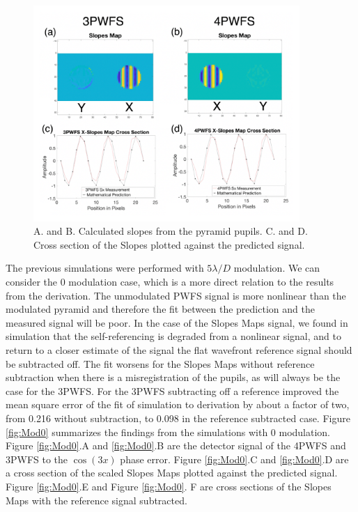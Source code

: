 \begin{figure}
    \centering
    \includegraphics[width=0.9\textwidth]{Chapter Materials/Chapter Two Materials/SlopesandSlices.png}
    \caption{A. and B. Calculated slopes from the pyramid pupils. C. and D. Cross section of the Slopes plotted against the predicted signal. }
    \label{fig:SlopesMapDiagram}
\end{figure}

The previous simulations were performed with $5\lambda/D$ modulation. We can consider the 0 modulation case, which is a more direct relation to the results from the derivation. The unmodulated PWFS signal is more nonlinear than the modulated pyramid and therefore the fit between the prediction and the measured signal will be poor. In the case of the Slopes Maps signal, we found in simulation that the self-referencing is degraded from a nonlinear signal, and to return to a closer estimate of the signal the flat wavefront reference signal should be subtracted off. The fit worsens for the Slopes Maps without reference subtraction when there is a misregistration of the pupils, as will always be the case for the 3PWFS. For the 3PWFS subtracting off a reference improved the mean square error of the fit of simulation to derivation by about a factor of two, from 0.216 without subtraction, to 0.098 in the reference subtracted case. Figure \ref{fig:Mod0} summarizes the findings from the simulations with 0 modulation. Figure \ref{fig:Mod0}.A and \ref{fig:Mod0}.B are the detector signal of the 4PWFS and 3PWFS to the $\cos(3x)$ phase error. Figure \ref{fig:Mod0}.C and \ref{fig:Mod0}.D are a cross section of the scaled Slopes Maps plotted against the predicted signal. Figure \ref{fig:Mod0}.E and Figure \ref{fig:Mod0}. F are cross sections of the Slopes Maps with the reference signal subtracted.

